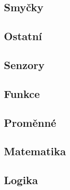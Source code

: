 \subsection{Smyčky }
\begin{itemize}
	\blockLoop
	\blockLoopForever
	\blockLoopWhile
\end{itemize}

\subsection{Ostatní }
\begin{itemize}
	\blockStart
	\blockMotorDone
	\blockWait
	\blockWaitUntil
	\blockComment
\end{itemize}

\subsection{Senzory }
\begin{itemize}
	\blockBumperPressed
\end{itemize}

\subsection{Funkce }
\begin{itemize}
	\blockFunctionDefinition
	\blockFunctionCall
\end{itemize}

\subsection{Proměnné }
\begin{itemize}
	\blockVariableCreate
	\blockVariableChange
	\blockVariableGet
	\blockVariableSet
\end{itemize}

\subsection{Matematika }
\begin{itemize}
	\blockMathOperation
	\blockMathTest
	\blockMathValue
	\blockMathConstant
	\blockMathRandom
\end{itemize}

\subsection{Logika }
\begin{itemize}
	\blockLogicTrue
	\blockLogicFalse
\end{itemize}

